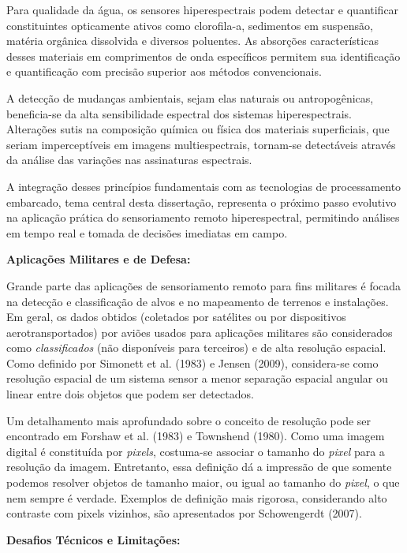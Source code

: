 Para qualidade da água, os sensores hiperespectrais podem detectar e 
quantificar constituintes opticamente ativos como clorofila-a, sedimentos 
em suspensão, matéria orgânica dissolvida e diversos poluentes. As absorções 
características desses materiais em comprimentos de onda específicos 
permitem sua identificação e quantificação com precisão superior aos métodos 
convencionais.

A detecção de mudanças ambientais, sejam elas naturais ou antropogênicas, 
beneficia-se da alta sensibilidade espectral dos sistemas hiperespectrais. 
Alterações sutis na composição química ou física dos materiais superficiais, 
que seriam imperceptíveis em imagens multiespectrais, tornam-se detectáveis 
através da análise das variações nas assinaturas espectrais.

A integração desses princípios fundamentais com as tecnologias de 
processamento embarcado, tema central desta dissertação, representa o 
próximo passo evolutivo na aplicação prática do sensoriamento remoto 
hiperespectral, permitindo análises em tempo real e tomada de decisões 
imediatas em campo.

\textbf{Aplicações Militares e de Defesa:}

Grande parte das aplicações de sensoriamento remoto para fins militares 
é focada na detecção e classificação de alvos e no mapeamento de 
terrenos e instalações. Em geral, os dados obtidos (coletados por 
satélites ou por dispositivos aerotransportados) por aviões usados para 
aplicações militares são considerados como \textit{classificados} (não 
disponíveis para terceiros) e de alta resolução espacial. Como definido por Simonett et al. (1983) e Jensen (2009), considera-se
como resolução espacial de um sistema sensor a menor separação espacial
angular ou linear entre dois objetos que podem ser detectados.

Um detalhamento mais aprofundado sobre o conceito de resolução pode ser 
encontrado em Forshaw et al. (1983) e Townshend (1980). Como uma imagem 
digital é constituída por \textit{pixels}, costuma-se associar o tamanho 
do \textit{pixel} para a resolução da imagem. Entretanto, essa definição 
dá a impressão de que somente podemos resolver objetos de tamanho maior, 
ou igual ao tamanho do \textit{pixel}, o que nem sempre é verdade. Exemplos de definição mais rigorosa, considerando alto contraste com
pixels vizinhos, são apresentados por Schowengerdt (2007).

\textbf{Desafios Técnicos e Limitações:}

